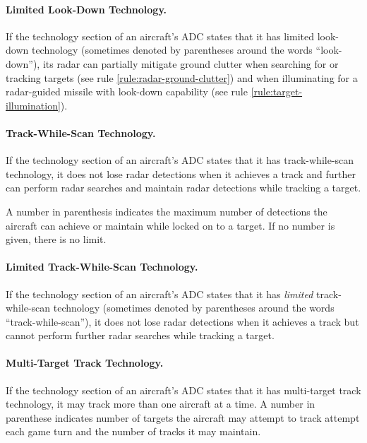 {\begin{advancedrules}
\paragraph{Limited Look-Down Technology.} \label{rule:limited-look-down-technology} If the technology section of an aircraft’s ADC states that it has limited look-down technology (sometimes denoted by parentheses around the words “look-down”), its radar can partially mitigate ground clutter when searching for or tracking targets (see rule \ref{rule:radar-ground-clutter}) and when illuminating for a radar-guided missile with look-down capability (see rule \ref{rule:target-illumination}).


\paragraph{Track-While-Scan Technology.} \label{rule:track-while-scan-technology} If the technology section of an aircraft’s ADC states that it has track-while-scan technology, it does not lose radar detections when it achieves a track and further can perform radar searches and maintain radar detections while tracking a target.

A number in parenthesis indicates the maximum number of detections the aircraft can achieve or maintain while locked on to a target. If no number is given, there is no limit.


\paragraph{Limited Track-While-Scan Technology.} If the technology section of an aircraft’s ADC states that it has \emph{limited} track-while-scan technology (sometimes denoted by parentheses around the words “track-while-scan”), it does not lose radar detections when it achieves a track but cannot perform further radar searches while tracking a target.

\paragraph{Multi-Target Track Technology.}\label{rule:multi-target-track-technology}  If the technology section of an aircraft’s ADC states that it has multi-target track technology, it may track more than one aircraft at a time. A number in parenthese indicates number of targets the aircraft may attempt to track attempt each game turn and the number of tracks it may maintain. 


\end{advancedrules}}
